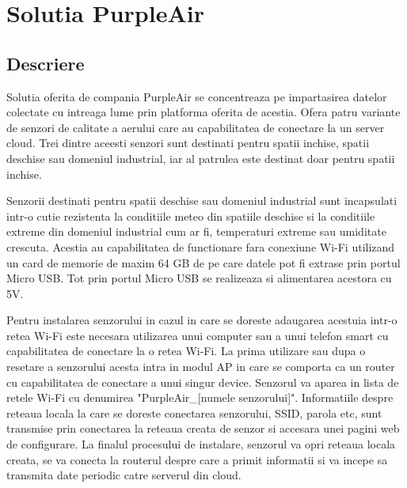 \section{Solutia PurpleAir}\label{sec:sb_purpleair}
\subsection{Descriere}\label{subsec:sb_purpleair_descriere}
Solutia oferita de compania PurpleAir se concentreaza pe impartasirea datelor colectate cu intreaga lume prin platforma oferita de acestia. Ofera patru variante 
de senzori de calitate a aerului care au capabilitatea de conectare la un server cloud. Trei dintre aceesti senzori sunt destinati pentru spatii inchise, spatii 
deschise sau domeniul industrial, iar al patrulea este destinat doar pentru spatii inchise.

Senzorii destinati pentru spatii deschise sau domeniul industrial sunt incapsulati intr-o cutie rezistenta la conditiile meteo din spatiile deschise si la 
conditiile extreme din domeniul industrial cum ar fi, temperaturi extreme sau umiditate crescuta. Acestia au capabilitatea de functionare fara conexiune Wi-Fi 
utilizand un card de memorie de maxim 64 GB de pe care datele pot fi extrase prin portul Micro USB. Tot prin portul Micro USB se realizeaza si alimentarea 
acestora cu 5V.

Pentru instalarea senzorului in cazul in care se doreste adaugarea acestuia intr-o retea Wi-Fi este necesara utilizarea unui computer sau a unui telefon smart 
cu capabilitatea de conectare la o retea Wi-Fi. La prima utilizare sau dupa o resetare a senzorului acesta intra in modul AP in care se comporta ca un router cu 
capabilitatea de conectare a unui singur device. Senzorul va aparea in lista de retele Wi-Fi cu denumirea "PurpleAir\_[numele senzorului]". Informatiile despre 
reteaua locala la care se doreste conectarea senzorului, SSID, parola etc, sunt transmise prin conectarea la reteaua creata de senzor si accesara unei pagini 
web de configurare. La finalul procesului de instalare, senzorul va opri reteaua locala creata, se va conecta la routerul despre care a primit informatii 
si va incepe sa transmita date periodic catre serverul din cloud.

